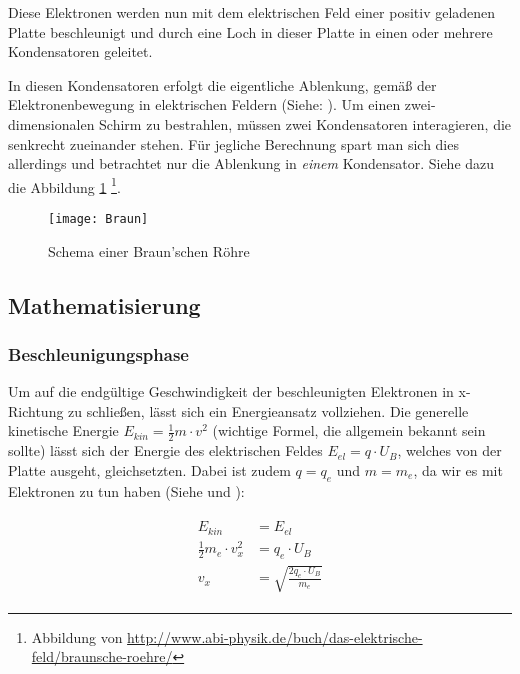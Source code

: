 Diese Elektronen werden nun mit dem elektrischen Feld einer positiv geladenen Platte beschleunigt und durch eine Loch in dieser Platte in einen oder mehrere Kondensatoren geleitet.

In diesen Kondensatoren erfolgt die eigentliche Ablenkung, gemäß der Elektronenbewegung in elektrischen Feldern (Siehe: ). Um einen zwei-dimensionalen Schirm zu bestrahlen, müssen zwei Kondensatoren interagieren, die senkrecht zueinander stehen. Für jegliche Berechnung spart man sich dies allerdings und betrachtet nur die Ablenkung in \emph{einem} Kondensator. Siehe dazu die Abbildung \ref{fig:BraunscheRoehre} \footnote{Abbildung von \url{http://www.abi-physik.de/buch/das-elektrische-feld/braunsche-roehre/}}.

\begin{figure}[h!] 
	\centering
	\texttt{[image: Braun]}
	\caption{Schema einer Braun'schen Röhre}
	\label{fig:BraunscheRoehre}
\end{figure}

\subsection{Mathematisierung}

\subsubsection{Beschleunigungsphase}

Um auf die endgültige Geschwindigkeit der beschleunigten Elektronen in x-Richtung zu schließen, lässt sich ein Energieansatz vollziehen. Die generelle kinetische Energie $E_{kin}=\frac{1}{2}m \cdot v^2$ (wichtige Formel, die allgemein bekannt sein sollte) lässt sich der Energie des elektrischen Feldes $E_{el}=q \cdot U_B$, welches von der Platte ausgeht, gleichsetzten. Dabei ist zudem $q = q_e$ und $m = m_e$, da wir es mit Elektronen zu tun haben (Siehe  und ):

\begin{align} \label{eq:BeschleunigungNachV}
\begin{split}
	E_{kin} &= E_{el} \\
	\frac{1}{2}m_e \cdot v_{x}^2 &= q_e \cdot U_B \\
	v_x &= \sqrt{\frac{2q_e \cdot U_B}{m_e}}
\end{split}
\end{align}

